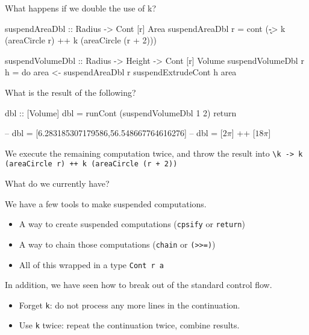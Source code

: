 \documentclass[ignorenonframetext,]{beamer}
\begin{document}
\begin{frame}[fragile]{What happens if we double the use of k?}

\begin{haskellcode}
suspendAreaDbl :: Radius -> Cont [r] Area
suspendAreaDbl r = cont (\k -> k (areaCircle r) ++
                               k (areaCircle (r + 2)))

suspendVolumeDbl :: Radius -> Height -> Cont [r] Volume
suspendVolumeDbl r h = do
  area <- suspendAreaDbl r
  suspendExtrudeCont h area
\end{haskellcode}

What is the result of the following?

\begin{haskellcode}
dbl :: [Volume]
dbl = runCont (suspendVolumeDbl 1 2) return
\end{haskellcode}

\pause

\begin{haskellcode}
-- dbl = [6.283185307179586,56.548667764616276]
-- dbl = [$2 \pi$] ++ [$18 \pi$]
\end{haskellcode}

We execute the remaining computation twice, and throw the result into
\texttt{\textbackslash{}k -\textgreater{} k (areaCircle r) ++ k (areaCircle (r + 2))}

\end{frame}

\begin{frame}{What do we currently have?}

We have a few tools to make suspended computations.

\begin{itemize}
\itemsep1pt\parskip0pt
\item
  A way to create suspended computations (\texttt{cpsify} or
  \texttt{return})
\item
  A way to chain those computations (\texttt{chain} or
  \texttt{(\textgreater{}\textgreater{}=)})
\item
  All of this wrapped in a type \texttt{Cont r a}
\end{itemize}

In addition, we have seen how to break out of the standard control flow.

\begin{itemize}
\itemsep1pt\parskip0pt
\item
  Forget \texttt{k}: do not process any more lines in the continuation.
\item
  Use \texttt{k} twice: repeat the continuation twice, combine results.
\end{itemize}

\end{frame}
\end{document}
